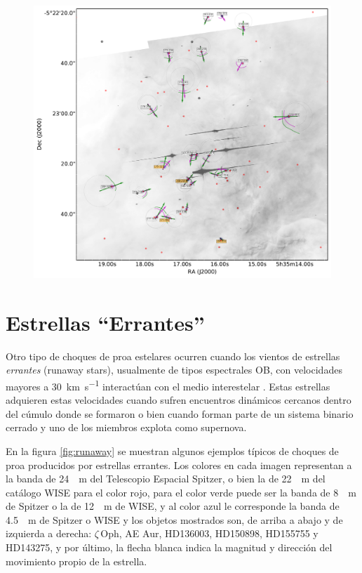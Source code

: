 \begin{figure}
  \centering
  \ContinuedFloat
  \captionsetup{list=off, format=cont}  
  \includegraphics[width=\linewidth]{./Figures/ll-pos-image-zoom-Luis}
  \caption{}
  \label{orion-map-LL-2}
\end{figure}


\section{Estrellas ``Errantes''}
\label{sec:runaway}

Otro tipo de choques de proa estelares ocurren cuando los vientos de estrellas \textit{errantes} (runaway stars), usualmente de tipos espectrales OB, con velocidades mayores a \SI{30}{km.s^{-1}} interactúan con el medio interestelar \citep{Kobulnicky:2016}. Estas estrellas adquieren estas velocidades cuando sufren encuentros dinámicos cercanos dentro del cúmulo donde se formaron o bien cuando forman parte de un sistema binario cerrado y uno de los miembros explota como supernova.

En la figura \ref{fig:runaway} se muestran algunos ejemplos típicos de choques de proa producidos por estrellas errantes. Los colores en cada imagen representan a la banda de \SI{24}{\mu.m} del Telescopio Espacial Spitzer, o bien la de \SI{22}{\mu.m} del catálogo WISE para el color rojo, para el color verde puede ser la banda de \SI{8}{\mu.m} de Spitzer o la de \SI{12}{\mu.m} de WISE, y al color azul le corresponde la banda de \SI{4.5}{\mu.m} de Spitzer o WISE y los objetos mostrados son, de arriba a abajo y de izquierda a derecha: $\zeta$\,Oph, AE Aur, HD136003, HD150898, HD155755 y HD143275, y por último, la flecha blanca indica la magnitud y dirección del movimiento propio de la estrella.

